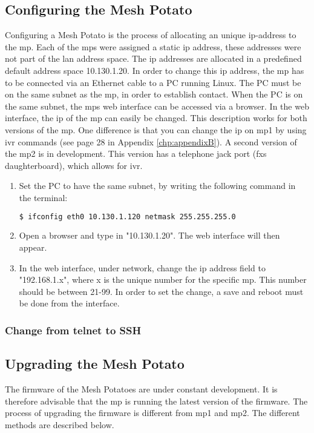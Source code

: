 \subsection{Configuring the Mesh Potato}
\label{subsec:configuring}
Configuring a Mesh Potato is the process of allocating an unique \gls{ip}-address to the \gls{mp}. Each of the \glspl{mp} were assigned a static \gls{ip} address, these addresses were not part of the \gls{lan} address space. The \gls{ip} addresses are allocated in a predefined default address space 10.130.1.20. In order to change this \gls{ip} address, the \gls{mp} has to be connected via an Ethernet cable to a PC running Linux. The PC must be on the same subnet as the \gls{mp}, in order to establish contact. When the PC is on the same subnet, the \glspl{mp} web interface can be accessed via a browser. In the web interface, the \gls{ip} of the \gls{mp} can easily be changed. This description works for both versions of the \gls{mp}. One difference is that you can change the \gls{ip} on \gls{mp1} by using \gls{ivr} commands (see page 28 in Appendix \ref{chp:appendixB}). A second version of the \gls{mp2} is in development. This version has a telephone jack port (\gls{fxs} daughterboard), which allows for \gls{ivr}. 

\begin{enumerate}
\item Set the PC to have the same subnet, by writing the following command in the terminal:
\noindent
\begin{lstlisting}[language=bash]
  $ ifconfig eth0 10.130.1.120 netmask 255.255.255.0
\end{lstlisting}
\item Open a browser and type in "10.130.1.20". The web interface will then appear. 
\item In the web interface, under network, change the \gls{ip} address field to "192.168.1.x", where x is the unique number for the specific \gls{mp}. This number should be between 21-99. In order to set the change, a save and reboot must be done from the interface. 
\end{enumerate}

\subsubsection{Change from telnet to SSH}
\label{subsubsec:ssh}

\subsection{Upgrading the Mesh Potato}
\label{subsec:upgrading}
The firmware of the Mesh Potatoes are under constant development. It is therefore advisable that the \gls{mp} is running the latest version of the firmware. The process of upgrading the firmware is different from \gls{mp1} and \gls{mp2}. The different methods are described below. 

